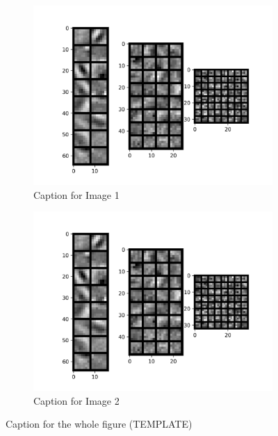 \documentclass{report}
\begin{document}
\begin{figure}[t!]
  \centering
  \hspace{-2cm}
  \begin{subfigure}[t]{0.49\textwidth}
    \centering
    \includegraphics[width=1.3\textwidth]{3.CNN_500_sample/CNN_filters.png}
    \caption{Caption for Image 1}
    \label{fig:image-set1-sub1}
  \end{subfigure}
  \hspace{-0.5cm}
  \begin{subfigure}[t]{0.49\textwidth}
    \centering
    \includegraphics[width=1.3\textwidth]{3.CNN_500_sample/CNN_filters.png}
    \caption{Caption for Image 2}
    \label{fig:image-set1-sub2}
  \end{subfigure}

  \caption{Caption for the whole figure (TEMPLATE)}
  \label{fig:figure}
\end{figure}
\end{document}
